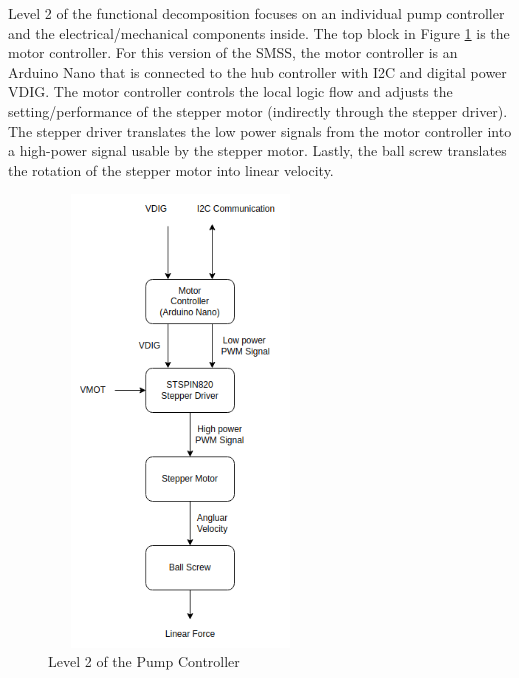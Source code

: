 \documentclass[journal]{IEEEtran}
\begin{document}
            Level 2 of the functional decomposition focuses on an individual pump controller and the electrical/mechanical components inside. The top block in Figure \ref{fig:level2} is the motor controller. For this version of the SMSS, the motor controller is an Arduino Nano that is connected to the hub controller with I2C and digital power VDIG. The motor controller controls the local logic flow and adjusts the setting/performance of the stepper motor (indirectly through the stepper driver). The stepper driver translates the low power signals from the motor controller into a high-power signal usable by the stepper motor. Lastly, the ball screw translates the rotation of the stepper motor into linear velocity.
            
            \begin{figure}[H]
                \centering
                \includegraphics[width=7cm, height=12cm]{level2_controller}
                \caption{Level 2 of the Pump Controller}
                \label{fig:level2}
            \end{figure}
            
\end{document}
